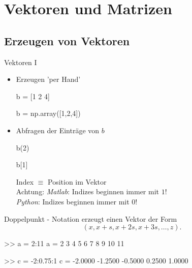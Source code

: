 \documentclass[hyperref={xetex}]{beamer}
\begin{document}
\section{Vektoren und Matrizen}



\subsection{Erzeugen von Vektoren}
%
%
\begin{frame}[fragile]{Vektoren I}
\begin{itemize}
\item Erzeugen 'per Hand'
\begin{matlabin}
b = [1 2 4]
\end{matlabin}
\begin{pyin}
b = np.array([1,2,4])
\end{pyin}

\item Abfragen der Einträge von $b$
\begin{matlabin}
b(2)
\end{matlabin}
\begin{pyin}
b[1]
\end{pyin}

Index $\equiv$ Position im Vektor\\

\alert{Achtung}: \emph{Matlab}: Indizes beginnen immer mit $1$!\\
\emph{Python}: Indizes beginnen immer mit $0$!

\end{itemize}
\end{frame}

%
%
\begin{frame}[fragile]{Doppelpunkt - Notation}
 erzeugt einen Vektor der Form 
\[ (x,x+s,x+2s,x+3s, \ldots , z). \]
\begin{matlabin}
>> a = 2:11
a =
 2  3  4  5  6  7  8  9  10  11

>> c = -2:0.75:1
c =
 -2.0000 -1.2500 -0.5000 0.2500 1.0000
\end{matlabin}
\end{frame} 
\end{document}
